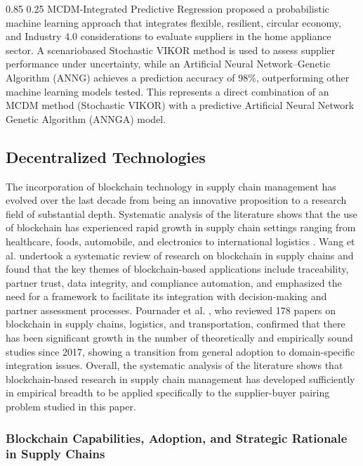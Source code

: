 \documentclass[11pt]{article}
\makeatletter
\renewcommand\paragraph{\@startsection{paragraph}{4}{\z@}%
  {0.85\baselineskip}%
  {0.25\baselineskip}%
  {\normalfont\normalsize\bfseries}}
\makeatother
\begin{document}
\paragraph{MCDM-Integrated Predictive Regression}
\cite{ref46a} proposed a probabilistic machine learning approach that integrates flexible, resilient, circular economy, and Industry 4.0 considerations to evaluate suppliers in the home appliance sector. A scenariobased Stochastic VIKOR method is used to assess supplier performance under uncertainty, while an Artificial Neural Network--Genetic Algorithm (ANNG) achieves a prediction accuracy of 98\%, outperforming other machine learning models tested. This represents a direct combination of an MCDM method (Stochastic VIKOR) with a predictive Artificial Neural Network Genetic Algorithm (ANNGA) model.
\subsection{Decentralized Technologies}
The incorporation of blockchain technology in supply chain management has evolved over the last decade from being an innovative proposition to a research field of substantial depth. Systematic analysis of the literature shows that the use of blockchain has experienced rapid growth in supply chain settings ranging from healthcare, foods, automobile, and electronics to international logistics \cite{ref54,ref59}. Wang et al. \cite{ref54} undertook a systematic review of research on blockchain in supply chains and found that the key themes of blockchain-based applications include traceability, partner trust, data integrity, and compliance automation, and emphasized the need for a framework to facilitate its integration with decision-making and partner assessment processes. Pournader et al. \cite{ref59}, who reviewed 178 papers on blockchain in supply chains, logistics, and transportation, confirmed that there has been significant growth in the number of theoretically and empirically sound studies since 2017, showing a transition from general adoption to domain-specific integration issues. Overall, the systematic analysis of the literature shows that blockchain-based research in supply chain management has developed sufficiently in empirical breadth to be applied specifically to the supplier-buyer pairing problem studied in this paper.

\subsubsection{Blockchain Capabilities, Adoption, and Strategic Rationale in Supply Chains}
\end{document}
